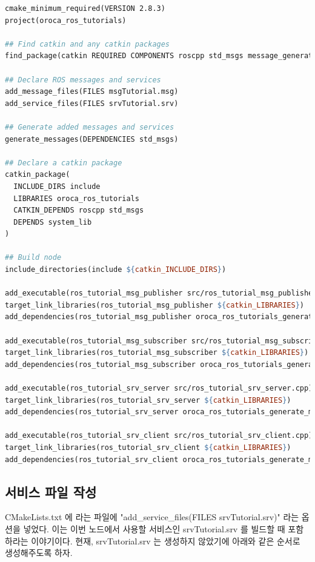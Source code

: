 \begin{lstlisting}[language=make]
cmake_minimum_required(VERSION 2.8.3)
project(oroca_ros_tutorials)

## Find catkin and any catkin packages
find_package(catkin REQUIRED COMPONENTS roscpp std_msgs message_generation)

## Declare ROS messages and services
add_message_files(FILES msgTutorial.msg)
add_service_files(FILES srvTutorial.srv)

## Generate added messages and services
generate_messages(DEPENDENCIES std_msgs)

## Declare a catkin package
catkin_package(
  INCLUDE_DIRS include
  LIBRARIES oroca_ros_tutorials
  CATKIN_DEPENDS roscpp std_msgs
  DEPENDS system_lib
)

## Build node
include_directories(include ${catkin_INCLUDE_DIRS})

add_executable(ros_tutorial_msg_publisher src/ros_tutorial_msg_publisher.cpp)
target_link_libraries(ros_tutorial_msg_publisher ${catkin_LIBRARIES})
add_dependencies(ros_tutorial_msg_publisher oroca_ros_tutorials_generate_messages_cpp)

add_executable(ros_tutorial_msg_subscriber src/ros_tutorial_msg_subscriber.cpp)
target_link_libraries(ros_tutorial_msg_subscriber ${catkin_LIBRARIES})
add_dependencies(ros_tutorial_msg_subscriber oroca_ros_tutorials_generate_messages_cpp)

add_executable(ros_tutorial_srv_server src/ros_tutorial_srv_server.cpp)
target_link_libraries(ros_tutorial_srv_server ${catkin_LIBRARIES})
add_dependencies(ros_tutorial_srv_server oroca_ros_tutorials_generate_messages_cpp)

add_executable(ros_tutorial_srv_client src/ros_tutorial_srv_client.cpp)
target_link_libraries(ros_tutorial_srv_client ${catkin_LIBRARIES})
add_dependencies(ros_tutorial_srv_client oroca_ros_tutorials_generate_messages_cpp)
\end{lstlisting}

\subsection{서비스 파일 작성}

CMakeLists.txt 에 라는 파일에 "add\_service\_files(FILES srvTutorial.srv)" 라는 옵션을 넣었다. 이는 이번 노드에서 사용할 서비스인 srvTutorial.srv 를 빌드할 때 포함하라는 이야기이다. 현재, srvTutorial.srv 는 생성하지 않았기에 아래와 같은 순서로 생성해주도록 하자.

